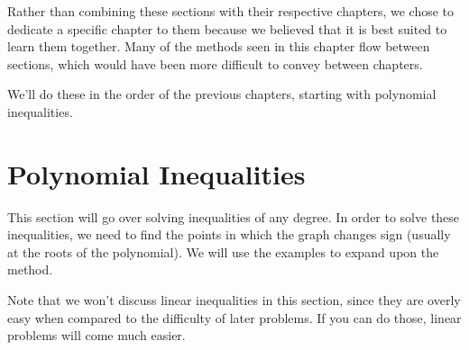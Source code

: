 \documentclass[lang=en,11pt]{elegantbook}
\begin{document}
Rather than combining these sections with their respective chapters, we chose to dedicate a specific chapter to them because we believed that it is best suited to learn them together.  Many of the methods seen in this chapter flow between sections, which would have been more difficult to convey between chapters.

We'll do these in the order of the previous chapters, starting with polynomial inequalities.
\section{Polynomial Inequalities}
\noindent This section will go over solving inequalities of any degree.  In order to solve these inequalities, we need to find the points in which the graph changes sign (usually at the roots of the polynomial).  We will use the examples to expand upon the method.

\begin{remark}
Note that we won't discuss linear inequalities in this section, since they are overly easy when compared to the difficulty of later problems.  If you can do those, linear problems will come much easier.
\end{remark}
\end{document}
